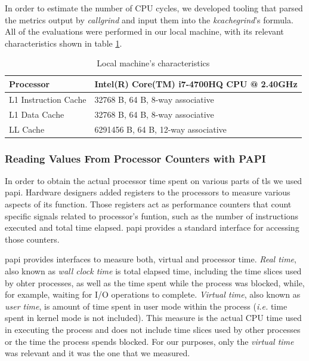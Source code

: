 In order to estimate the number of CPU cycles, we developed tooling that parsed the metrics output by
\textit{callgrind} and input them into the \textit{kcachegrind}'s formula. All of the evaluations were performed in
our local machine, with its relevant characteristics shown in table \ref{table:local-machine}.

\begin{table}[]
\begin{tabular}{|l|l|}
\hline
Processor            & Intel(R) Core(TM) i7-4700HQ CPU @ 2.40GHz \\ \hline
L1 Instruction Cache & 32768 B, 64 B, 8-way associative          \\ \hline
L1 Data Cache        & 32768 B, 64 B, 8-way associative          \\ \hline
LL Cache             & 6291456 B, 64 B, 12-way associative       \\ \hline
\end{tabular}
\centering \caption{\label{table:local-machine} Local machine's characteristics}
\end{table}

\subsubsection{Reading Values From Processor Counters with PAPI}

In order to obtain the actual processor time spent on various parts of \gls{tls} 
we used \gls{papi}. Hardware designers added registers to the processors to measure various 
aspects of its function. Those registers act as performance counters that count specific
signals related to processor's funtion, such as the number of instructions executed and total
time elapsed. \gls{papi} provides a standard interface for accessing those counters.

\gls{papi} provides interfaces to measure both, virtual and processor time. \textit{Real time},
also known as \textit{wall clock time} is total elapsed time, including the time slices used
by ohter processes, as well as the time spent while the process was blocked, while, for example,
waiting for I/O operations to complete. \textit{Virtual time}, also known as \textit{user time},
is amount of time spent in user mode within the process (\textit{i.e.} time spent in kernel mode is not included). 
This measure is the actual CPU time used in executing the process and does not include time slices 
used by other processes or the time the process spends blocked. For our purposes, only the \textit{virtual time}
was relevant and it was the one that we measured.

